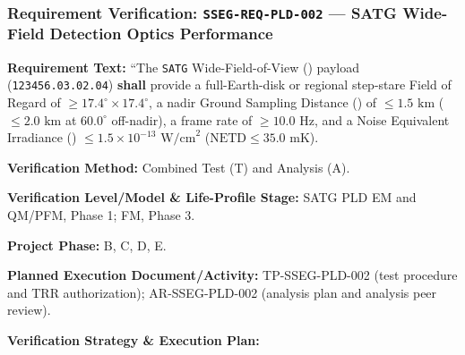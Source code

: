 \subsubsection{Requirement Verification: \texttt{SSEG-REQ-PLD-002} --- SATG Wide-Field Detection Optics Performance}
\label{ver:SSEG-REQ-PLD-002}
\textbf{Requirement Text:} ``The \texttt{SATG} Wide-Field-of-View () payload (\texttt{123456.03.02.04}) \textbf{shall} provide a full-Earth-disk or regional step-stare Field of Regard of $\ge 17.4^\circ \times 17.4^\circ$, a nadir Ground Sampling Distance () of $\le 1.5\text{ km}$ ($\le 2.0\text{ km}$ at $60.0^\circ$ off-nadir), a frame rate of $\ge 10.0\text{ Hz}$, and a Noise Equivalent Irradiance () $\le 1.5 \times 10^{-13}\text{ W/cm}^2$ ($\text{NETD} \le 35.0\text{ mK}$).
\par\textbf{Verification Method:} Combined Test (T) and Analysis (A).
\par\textbf{Verification Level/Model \& Life-Profile Stage:} SATG PLD EM and QM/PFM, Phase 1; FM, Phase 3.
\par\textbf{Project Phase:} B, C, D, E.
\par\textbf{Planned Execution Document/Activity:} TP-SSEG-PLD-002 (test procedure and TRR authorization); AR-SSEG-PLD-002 (analysis plan and analysis peer review).
\par\textbf{Verification Strategy \& Execution Plan:}
